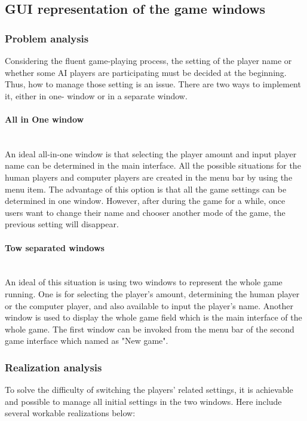 \subsection{GUI representation of the game windows}
\subsubsection{Problem analysis}

Considering the fluent game-playing process, the setting of the player name or whether some AI players are participating must be decided at the beginning. Thus, how to manage those setting is an issue. There are two ways to implement it,  either in one- window or in a separate window. 

\paragraph{All in One window} \mbox{}\\

An ideal all-in-one window is that selecting the player amount and input player name can be determined in the main interface. All the possible situations for the human players and computer players are created in the menu bar by using the menu item. The advantage of this option is that all the game settings can be determined in one window. However, after during the game for a while, once users want to change their name and chooser another mode of the game, the previous setting will disappear. 

\paragraph{Tow separated windows} \mbox{}\\

An ideal of this situation is using two windows to represent the whole game running. One is for selecting the player's amount, determining the human player or the computer player, and also available to input the player's name. Another window is used to display the whole game field which is the main interface of the whole game. The first window can be invoked from the menu bar of the second game interface which named as "New game".    

\subsubsection{Realization analysis}

To solve the difficulty of switching the players' related settings, it is achievable and possible to manage all initial settings in the two windows. Here include several workable realizations below: 

